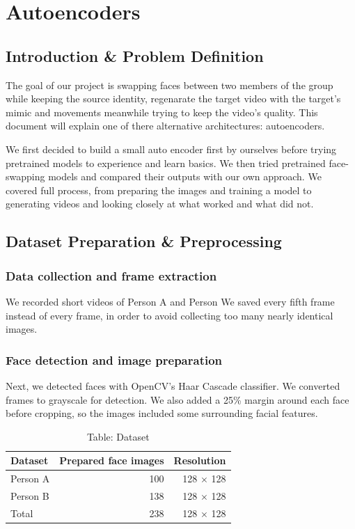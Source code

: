 
\section{Autoencoders}

\subsection{Introduction \& Problem Definition}
The goal of our project is swapping faces between two members of the group while keeping the source identity, regenarate the target video with the target’s mimic and movements meanwhile trying to keep the video’s quality. This document will explain one of there alternative architectures: autoencoders.

We first decided to build a small auto encoder first by ourselves before trying pretrained models to experience and learn basics. We then tried pretrained face-swapping models and compared their outputs with our own approach. We covered full process, from preparing the images and training a model to generating videos and looking closely at what worked and what did not.

\subsection{Dataset Preparation \& Preprocessing}
\subsubsection{Data collection and frame extraction}
We recorded short videos of Person A and Person We saved every fifth frame instead of every frame, in order to avoid collecting too many nearly identical images.

\subsubsection{Face detection and image preparation}
Next, we detected faces with OpenCV's Haar Cascade classifier. We converted frames to grayscale for detection. We also added a 25\% margin around each face before cropping, so the images included some surrounding facial features.

\begin{table}[tb]
  \centering
  \footnotesize
  \begin{tabular}{@{}l r r@{}}
    \toprule
    Dataset & Prepared face images & Resolution \\
    \midrule
    Person A & 100 & 128 $\times$ 128 \\
    Person B & 138 & 128 $\times$ 128 \\
    Total & 238 & 128 $\times$ 128 \\
    \bottomrule
  \end{tabular}
  \caption*{Table: Dataset}
\end{table}

